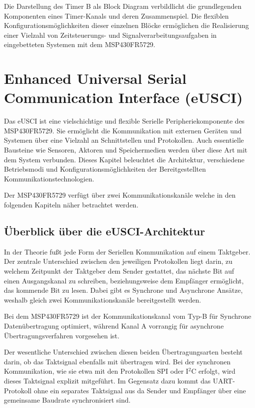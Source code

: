Die Darstellung  des Timer B als Block Diagram verbildlicht die grundlegenden Komponenten eines Timer-Kanals und deren Zusammenspiel. Die flexiblen Konfigurationsm\"oglichkeiten dieser einzelnen Bl\"ocke erm\"oglichen die Realisierung einer Vielzahl von Zeitsteuerungs- und Signalverarbeitungsaufgaben in eingebetteten Systemen mit dem MSP430FR5729.

\newpage
\section{Enhanced Universal Serial Communication Interface (eUSCI)}
\label{eUSCI}

Das eUSCI ist eine vielschichtige und flexible Serielle Peripheriekomponente des MSP430FR5729. Sie erm\"oglicht die Kommunikation mit externen Ger\"aten und Systemen \"uber eine Vielzahl an Schnittstellen und Protokollen. Auch essentielle Bausteine wie Sensoren, Aktoren und Speichermedien werden \"uber diese Art mit dem System verbunden. Dieses Kapitel beleuchtet die Architektur, verschiedene Betriebsmodi und Konfigurationsm\"oglichkeiten der Bereitgestellten Kommunikationstechnologien.

Der MSP430FR5729 verf\"ugt \"uber zwei Kommunikationskan\"ale welche in den folgenden Kapiteln n\"aher betrachtet werden. 

\subsection{\"Uberblick \"uber die eUSCI-Architektur}
\label{eUSCI_Architektur}

In der Theorie fu{\ss}t jede Form der Seriellen Kommunikation auf einem Taktgeber. Der zentrale Unterschied zwischen den jeweiligen Protokollen liegt darin, zu welchem Zeitpunkt der Taktgeber dem Sender gestattet, das n\"achste Bit auf einen Ausgangskanal zu schreiben, beziehungsweise dem Empf\"anger erm\"oglicht, das kommende Bit zu lesen. Dabei gibt es Synchrone und Asynchrone Ans\"atze, weshalb gleich zwei Kommunikationskan\"ale bereitgestellt werden. 

Bei dem MSP430FR5729 ist der Kommunikationskanal vom Typ-B f\"ur Synchrone Daten\"ubertragung optimiert, w\"ahrend Kanal A vorrangig f\"ur asynchrone \"Ubertragungsverfahren vorgesehen ist. 

Der wesentliche Unterschied zwischen diesen beiden \"Ubertragungsarten besteht darin, ob das Taktsignal ebenfalls mit \"ubertragen wird. Bei der synchronen Kommunikation, wie sie etwa mit den Protokollen SPI oder I$^{2}$C erfolgt, wird dieses Taktsignal explizit mitgef\"uhrt. Im Gegensatz dazu kommt das UART-Protokoll ohne ein separates Taktsignal aus da Sender und Empf\"anger \"uber eine gemeinsame Baudrate synchronisiert sind. 

